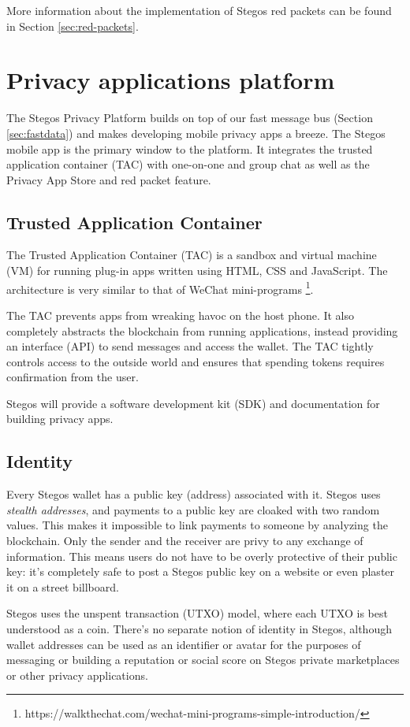 \documentclass[8pt,fleqn,openany]{book}
\begin{document}
	More information about the implementation of Stegos red packets can be found in Section \ref{sec:red-packets}.
	
	\chapter{Privacy applications platform}\label{chap:privacy-app-platform}
	The Stegos Privacy Platform builds on top of our fast message bus (Section \ref{sec:fastdata}) and makes developing mobile privacy apps a breeze. The Stegos mobile app is the primary window to the platform. It integrates the trusted application container (TAC) with one-on-one and group chat as well as the Privacy App Store and red packet feature. 
	
	\section{Trusted Application Container}\label{sec:tac}
	The Trusted Application Container (TAC) is a sandbox and virtual machine (VM) for running plug-in apps written using HTML, CSS and JavaScript. The architecture is very similar to that of WeChat mini-programs \footnote{https://walkthechat.com/wechat-mini-programs-simple-introduction/}.
	
	The TAC prevents apps from wreaking havoc on the host phone. It also completely abstracts the blockchain from running applications, instead providing an interface (API) to send messages and access the wallet. The TAC tightly controls access to the outside world and ensures that spending tokens requires confirmation from the user. 
	
	Stegos will provide a software development kit (SDK) and documentation for building privacy apps. 
	
	\section{Identity}\label{sec:identity}
	Every Stegos wallet has a public key (address) associated with it. Stegos uses \textit{stealth addresses}, and payments to a public key are cloaked with two random values. This makes it impossible to link payments to someone by analyzing the blockchain. Only the sender and the receiver are privy to any exchange of information. This means users do not have to be overly protective of their public key: it’s completely safe to post a Stegos public key on a website or even plaster it on a street billboard. 
	
	Stegos uses the unspent transaction (UTXO) model, where each UTXO is best understood as a coin. There’s no separate notion of identity in Stegos, although wallet addresses can be used as an identifier or avatar for the purposes of messaging or building a reputation or social score on Stegos private marketplaces or other privacy applications. 
	
\end{document}
